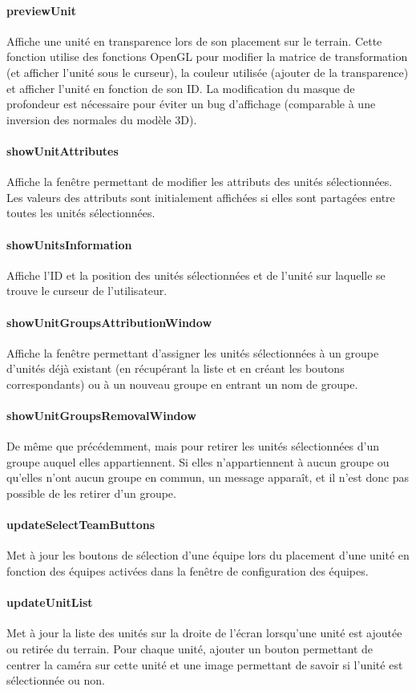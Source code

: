 \documentclass[a4paper]{article}
\begin{document}
\paragraph{previewUnit} Affiche une unité en transparence lors de son placement sur le terrain. Cette fonction utilise des fonctions OpenGL pour modifier la matrice de transformation (et afficher l'unité sous le curseur), la couleur utilisée (ajouter de la transparence) et afficher l'unité en fonction de son ID. La modification du masque de profondeur est nécessaire pour éviter un bug d'affichage (comparable à une inversion des normales du modèle 3D).
\paragraph{showUnitAttributes} Affiche la fenêtre permettant de modifier les attributs des unités sélectionnées. Les valeurs des attributs sont initialement affichées si elles sont partagées entre toutes les unités sélectionnées.
\paragraph{showUnitsInformation} Affiche l'ID et la position des unités sélectionnées et de l'unité sur laquelle se trouve le curseur de l'utilisateur.
\paragraph{showUnitGroupsAttributionWindow} Affiche la fenêtre permettant d'assigner les unités sélectionnées à un groupe d'unités déjà existant (en récupérant la liste et en créant les boutons correspondants) ou à un nouveau groupe en entrant un nom de groupe.
\paragraph{showUnitGroupsRemovalWindow} De même que précédemment, mais pour retirer les unités sélectionnées d'un groupe auquel elles appartiennent. Si elles n'appartiennent à aucun groupe ou qu'elles n'ont aucun groupe en commun, un message apparaît, et il n'est donc pas possible de les retirer d'un groupe.
\paragraph{updateSelectTeamButtons} Met à jour les boutons de sélection d'une équipe lors du placement d'une unité en fonction des équipes activées dans la fenêtre de configuration des équipes.
\paragraph{updateUnitList} Met à jour la liste des unités sur la droite de l'écran lorsqu'une unité est ajoutée ou retirée du terrain. Pour chaque unité, ajouter un bouton permettant de centrer la caméra sur cette unité et une image permettant de savoir si l'unité est sélectionnée ou non.
\end{document}

